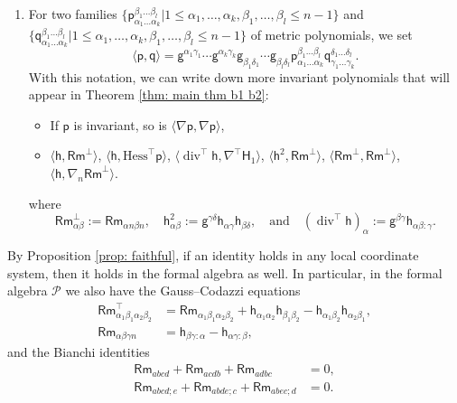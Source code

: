 \documentclass[11pt]{amsart}
\newcommand{\dvg}{\operatorname{div}}
\theoremstyle{definition}
\numberwithin{equation}{section}
\begin{document}
\begin{enumerate}
\item	For two families $\{\mathsf p_{\alpha_1\dots \alpha_k}^{\beta_1\dots \beta_l}|1\le \alpha_1, \dots, \alpha_k,     \beta_1,\dots,\beta_l \le n-1\}$ and $\{\mathsf q_{\alpha_1\dots \alpha_k}^{\beta_1\dots \beta_l}|1\le \alpha_1,\dots,\alpha_k,\beta_1,\dots,\beta_l\le n-1\}$  of metric polynomials, we set
	\[\langle\mathsf p,\mathsf q\rangle = \mathsf g^{\alpha_1\gamma_1}\cdots \mathsf g^{\alpha_k\gamma_k}\mathsf g_{\beta_1\delta_1}\cdots \mathsf g_{\beta_l\delta_l}\mathsf p_{\alpha_1\dots \alpha_k}^{\beta_1\dots \beta_l}\mathsf q_{\gamma_1\dots \gamma_k}^{\delta_1\dots \delta_l}.\]   
    With this notation, we can write down more invariant polynomials that will appear in Theorem \ref{thm: main thm b1 b2}:
	\begin{itemize} 
    \item If $\mathsf p$ is invariant, so is  $\langle \nabla \mathsf p, \nabla \mathsf p\rangle$,
	\item $\langle\mathsf h,\mathsf {Rm}^\bot\rangle$, $\langle\mathsf h, \mathrm{Hess}^\top\mathsf p\rangle$, $\langle\dvg^\top \mathsf h,\nabla^\top\mathsf H_1\rangle$, $\langle\mathsf h^2,\mathsf{Rm}^\bot\rangle$, $\langle\mathsf{Rm}^\bot,\mathsf{Rm}^\bot\rangle$, $\langle\mathsf h,\nabla_n\mathsf{Rm}^\bot\rangle$.
    \end{itemize}
 where 
 \[
 \mathsf {Rm}^\bot_{\alpha\beta} := \mathsf{Rm}_{\alpha n\beta n}, \quad  \mathsf h_{\alpha\beta}^2 := \mathsf g^{\gamma\delta}\mathsf h_{\alpha\gamma}\mathsf h_{\beta\delta}, \quad \text{and}\quad    (\dvg^\top\mathsf h)_\alpha := \mathsf g^{\beta\gamma}\mathsf h_{\alpha\beta:\gamma}.
 \]
  \end{enumerate} 

By Proposition \ref{prop: faithful}, if an identity holds in any local coordinate system, then it holds in the formal algebra as well. In particular, in the formal algebra $\mathcal P$ we also have the Gauss--Codazzi equations 
\begin{align}
    \label{eq: Gauss equation}
    \mathsf{Rm}^\top_{\alpha_1\beta_1\alpha_2\beta_2} & = \mathsf{Rm}_{\alpha_1\beta_1\alpha_2\beta_2} + \mathsf h_{\alpha_1\alpha_2}\mathsf h_{\beta_1\beta_2} - \mathsf h_{\alpha_1\beta_2}\mathsf h_{\alpha_2\beta_1},\\
    \label{eq: Codazzi equation}
    \mathsf{Rm}_{\alpha\beta\gamma n} & = \mathsf h_{\beta\gamma:\alpha} - \mathsf h_{\alpha\gamma:\beta},
\end{align}
and the Bianchi identities 
\begin{align}
    \label{eq: 1st Bianchi equation}
    \mathsf{Rm}_{abcd} + \mathsf{Rm}_{acdb} + \mathsf{Rm}_{adbc} & = 0,\\
    \label{eq: 2nd Bianchi equation}
    \mathsf{Rm}_{abcd;e} + \mathsf{Rm}_{abde;c} + \mathsf{Rm}_{abec;d} & = 0.
\end{align}
\end{document}
